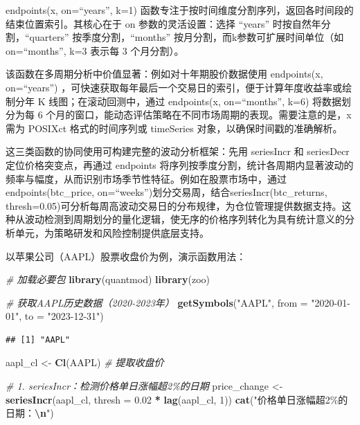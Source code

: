 \documentclass[]{ctexbook}
\newenvironment{Shaded}{\begin{snugshade}}{\end{snugshade}}
\newcommand{\AttributeTok}[1]{\textcolor[rgb]{0.13,0.29,0.53}{#1}}
\newcommand{\CommentTok}[1]{\textcolor[rgb]{0.56,0.35,0.01}{\textit{#1}}}
\newcommand{\DecValTok}[1]{\textcolor[rgb]{0.00,0.00,0.81}{#1}}
\newcommand{\FloatTok}[1]{\textcolor[rgb]{0.00,0.00,0.81}{#1}}
\newcommand{\FunctionTok}[1]{\textcolor[rgb]{0.13,0.29,0.53}{\textbf{#1}}}
\newcommand{\NormalTok}[1]{#1}
\newcommand{\OtherTok}[1]{\textcolor[rgb]{0.56,0.35,0.01}{#1}}
\newcommand{\SpecialCharTok}[1]{\textcolor[rgb]{0.81,0.36,0.00}{\textbf{#1}}}
\newcommand{\StringTok}[1]{\textcolor[rgb]{0.31,0.60,0.02}{#1}}
\begin{document}
endpoints(x, on=``years'', k=1) 函数专注于按时间维度分割序列，返回各时间段的结束位置索引。其核心在于 on 参数的灵活设置：选择 ``years'' 时按自然年分割，``quarters'' 按季度分割，``months'' 按月分割，而k参数可扩展时间单位（如 on=``months'', k=3 表示每 3 个月分割）。

该函数在多周期分析中价值显著：例如对十年期股价数据使用 endpoints(x, on=``years'') ，可快速获取每年最后一个交易日的索引，便于计算年度收益率或绘制分年 K 线图；在滚动回测中，通过 endpoints(x, on=``months'', k=6) 将数据划分为每 6 个月的窗口，能动态评估策略在不同市场周期的表现。需要注意的是，x 需为 POSIXct 格式的时间序列或 timeSeries 对象，以确保时间戳的准确解析。

这三类函数的协同使用可构建完整的波动分析框架：先用 seriesIncr 和 seriesDecr 定位价格突变点，再通过 endpoints 将序列按季度分割，统计各周期内显著波动的频率与幅度，从而识别市场季节性特征。例如在股票市场中，通过endpoints(btc\_price, on=``weeks'')划分交易周，结合seriesIncr(btc\_returns, thresh=0.05)可分析每周高波动交易日的分布规律，为仓位管理提供数据支持。这种从波动检测到周期划分的量化逻辑，使无序的价格序列转化为具有统计意义的分析单元，为策略研发和风险控制提供底层支持。

以苹果公司（AAPL）股票收盘价为例，演示函数用法：

\begin{Shaded}
\begin{Highlighting}[]
\CommentTok{\# 加载必要包}
\FunctionTok{library}\NormalTok{(quantmod)}
\FunctionTok{library}\NormalTok{(zoo)}

\CommentTok{\# 获取AAPL历史数据（2020{-}2023年）}
\FunctionTok{getSymbols}\NormalTok{(}\StringTok{"AAPL"}\NormalTok{, }\AttributeTok{from =} \StringTok{"2020{-}01{-}01"}\NormalTok{, }\AttributeTok{to =} \StringTok{"2023{-}12{-}31"}\NormalTok{)}
\end{Highlighting}
\end{Shaded}

\begin{verbatim}
## [1] "AAPL"
\end{verbatim}

\begin{Shaded}
\begin{Highlighting}[]
\NormalTok{aapl\_cl }\OtherTok{\textless{}{-}} \FunctionTok{Cl}\NormalTok{(AAPL)  }\CommentTok{\# 提取收盘价}

\CommentTok{\# 1. seriesIncr：检测价格单日涨幅超2\%的日期}
\NormalTok{price\_change }\OtherTok{\textless{}{-}} \FunctionTok{seriesIncr}\NormalTok{(aapl\_cl, }\AttributeTok{thresh =} \FloatTok{0.02} \SpecialCharTok{*} \FunctionTok{lag}\NormalTok{(aapl\_cl, }\DecValTok{1}\NormalTok{))}
\FunctionTok{cat}\NormalTok{(}\StringTok{"价格单日涨幅超2\%的日期：}\SpecialCharTok{\textbackslash{}n}\StringTok{"}\NormalTok{)}
\end{Highlighting}
\end{Shaded}
\end{document}
